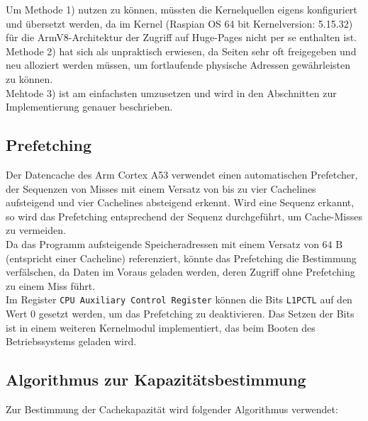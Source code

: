 \documentclass[]{scrbook}
\begin{document}
Um Methode 1) nutzen zu können, müssten die Kernelquellen eigens konfiguriert und übersetzt werden, da im Kernel (Raspian OS 64 bit Kernelversion: 5.15.32) für die ArmV8-Architektur der Zugriff auf Huge-Pages nicht per se enthalten ist.
\\
Methode 2) hat sich als unpraktisch erwiesen, da Seiten sehr oft freigegeben und neu alloziert werden müssen, um fortlaufende physische Adressen gewährleisten zu können.
\\
Mehtode 3) ist am einfachsten umzusetzen und wird in den Abschnitten zur Implementierung genauer beschrieben.

\subsection{Prefetching}

Der Datencache des Arm Cortex A53 verwendet einen automatischen Prefetcher, der Sequenzen von Misses mit einem Versatz von bis zu vier Cachelines aufsteigend und vier Cachelines absteigend erkennt.
Wird eine Sequenz erkannt, so wird das Prefetching entsprechend der Sequenz durchgeführt, um Cache-Misses zu vermeiden. \cite[S.\,337]{a53trm}
\\
Da das Programm aufsteigende Speicheradressen mit einem Versatz von $64 \textrm{ B}$ (entspricht einer Cacheline) referenziert, könnte das Prefetching die Bestimmung verfälschen, da Daten im Voraus geladen werden, deren Zugriff ohne Prefetching zu einem Miss führt.
\\
Im Register \texttt{CPU Auxiliary Control Register} können die Bits \texttt{L1PCTL} auf den Wert $0$ gesetzt werden, um das Prefetching zu deaktivieren. \cite[S.\,180]{a53trm} Das Setzen der Bits ist in einem weiteren Kernelmodul implementiert, das beim Booten des Betriebssystems geladen wird.

\subsection{Algorithmus zur Kapazitätsbestimmung} \label{alg_ccap}

Zur Bestimmung der Cachekapazität wird folgender Algorithmus verwendet:
\end{document}
